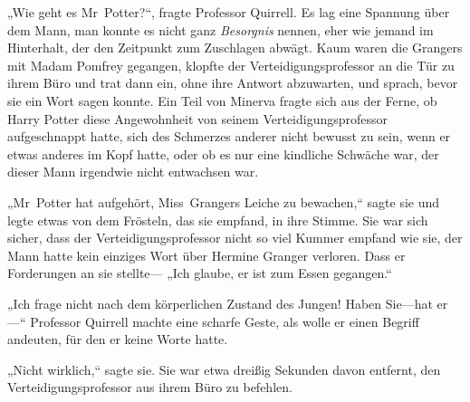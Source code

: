 „Wie geht es Mr~Potter?“, fragte Professor Quirrell.
Es lag eine Spannung über dem Mann, man konnte es nicht ganz \emph{Besorgnis} nennen, eher wie jemand im Hinterhalt, der den Zeitpunkt zum Zuschlagen abwägt. Kaum waren die Grangers mit Madam Pomfrey gegangen, klopfte der Verteidigungsprofessor an die Tür zu ihrem Büro und trat dann ein, ohne ihre Antwort abzuwarten, und sprach, bevor sie ein Wort sagen konnte. Ein Teil von Minerva fragte sich aus der Ferne, ob Harry Potter diese Angewohnheit von seinem Verteidigungsprofessor aufgeschnappt hatte, sich des Schmerzes anderer nicht bewusst zu sein, wenn er etwas anderes im Kopf hatte, oder ob es nur eine kindliche Schwäche war, der dieser Mann irgendwie nicht entwachsen war.

„Mr~Potter hat aufgehört, Miss~Grangers Leiche zu bewachen,“ sagte sie und legte etwas von dem Frösteln, das sie empfand, in ihre Stimme.
Sie war sich sicher, dass der Verteidigungsprofessor nicht so viel Kummer empfand wie sie, der Mann hatte kein einziges Wort über Hermine Granger verloren. Dass er Forderungen an sie stellte—
„Ich glaube, er ist zum Essen gegangen.“

„Ich frage nicht nach dem körperlichen Zustand des Jungen! Haben Sie—hat er—“ Professor Quirrell machte eine scharfe Geste, als wolle er einen Begriff andeuten, für den er keine Worte hatte.

„Nicht wirklich,“ sagte sie.
Sie war etwa dreißig Sekunden davon entfernt, den Verteidigungsprofessor aus ihrem Büro zu befehlen.

